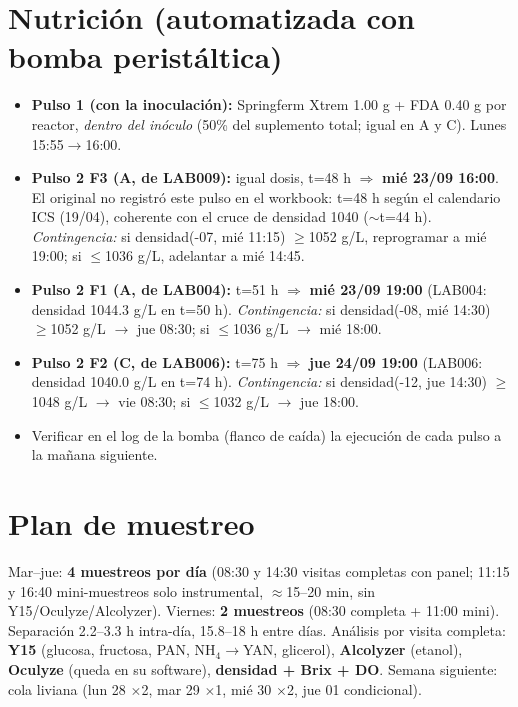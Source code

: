 \documentclass[10pt,landscape]{article}
\begin{document}
\section{Nutrición (automatizada con bomba peristáltica)}
\begin{itemize}\setlength{\itemsep}{1pt}
\item \textbf{Pulso 1 (con la inoculación):} Springferm Xtrem 1.00 g + FDA 0.40 g por reactor, \emph{dentro del inóculo} (50\% del suplemento total; igual en A y C). Lunes 15:55$\rightarrow$16:00.
\item \textbf{Pulso 2 F3 (A, de LAB009):} igual dosis, t=48 h $\Rightarrow$ \textbf{mié 23/09 16:00}. El original no registró este pulso en el workbook: t=48 h según el calendario ICS (19/04), coherente con el cruce de densidad 1040 ($\sim$t=44 h). \emph{Contingencia:} si densidad(-07, mié 11:15) $\geq$1052 g/L, reprogramar a mié 19:00; si $\leq$1036 g/L, adelantar a mié 14:45.
\item \textbf{Pulso 2 F1 (A, de LAB004):} t=51 h $\Rightarrow$ \textbf{mié 23/09 19:00} (LAB004: densidad 1044.3 g/L en t=50 h). \emph{Contingencia:} si densidad(-08, mié 14:30) $\geq$1052 g/L $\rightarrow$ jue 08:30; si $\leq$1036 g/L $\rightarrow$ mié 18:00.
\item \textbf{Pulso 2 F2 (C, de LAB006):} t=75 h $\Rightarrow$ \textbf{jue 24/09 19:00} (LAB006: densidad 1040.0 g/L en t=74 h). \emph{Contingencia:} si densidad(-12, jue 14:30) $\geq$1048 g/L $\rightarrow$ vie 08:30; si $\leq$1032 g/L $\rightarrow$ jue 18:00.
\item Verificar en el log de la bomba (flanco de caída) la ejecución de cada pulso a la mañana siguiente.
\end{itemize}

\section{Plan de muestreo}
Mar--jue: \textbf{4 muestreos por día} (08:30 y 14:30 visitas completas con panel; 11:15 y 16:40 mini-muestreos solo instrumental, $\approx$15--20 min, sin Y15/Oculyze/Alcolyzer). Viernes: \textbf{2 muestreos} (08:30 completa + 11:00 mini). Separación 2.2--3.3 h intra-día, 15.8--18 h entre días. Análisis por visita completa: \textbf{Y15} (glucosa, fructosa, PAN, NH$_4\rightarrow$YAN, glicerol), \textbf{Alcolyzer} (etanol), \textbf{Oculyze} (queda en su software), \textbf{densidad + Brix + DO}. Semana siguiente: cola liviana (lun 28 $\times$2, mar 29 $\times$1, mié 30 $\times$2, jue 01 condicional).
\end{document}
